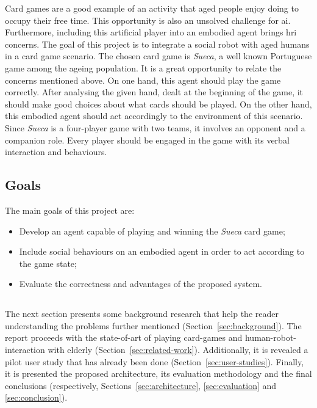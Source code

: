 Card games are a good example of an activity that aged people enjoy doing to occupy their free time.
This opportunity is also an unsolved challenge for \gls{ai}.
Furthermore, including this artificial player into an embodied agent brings \gls{hri} concerns.
The goal of this project is to integrate a social robot with aged humans in a card game scenario.
The chosen card game is \emph{Sueca}, a well known Portuguese game among the ageing population.
It is a great opportunity to relate the concerns mentioned above.
On one hand, this agent should play the game correctly.
After analysing the given hand, dealt at the beginning of the game, it should make good choices about what cards should be played.
On the other hand, this embodied agent should act accordingly to the environment of this scenario.
Since \emph{Sueca} is a four-player game with two teams, it involves an opponent and a companion role.
Every player should be engaged in the game with its verbal interaction and behaviours.


\subsection{Goals}
\label{sec:goals}

The main goals of this project are:
\begin{itemize}
\item Develop an agent capable of playing and winning the \emph{Sueca} card game;
\item Include social behaviours on an embodied agent in order to act according to the game state;
\item Evaluate the correctness and advantages of the proposed system.
\end{itemize}

\subsection*{\centering*}

The next section presents some background research that help the reader understanding the problems further mentioned (Section~\ref{sec:background}).
The report proceeds with the state-of-art of playing card-games and human-robot-interaction with elderly (Section~\ref{sec:related-work}).
Additionally, it is revealed a pilot user study that has already been done (Section~\ref{sec:user-studies}).
Finally, it is presented the proposed architecture, its evaluation methodology and the final conclusions (respectively, Sections~\ref{sec:architecture}, \ref{sec:evaluation} and \ref{sec:conclusion}).



